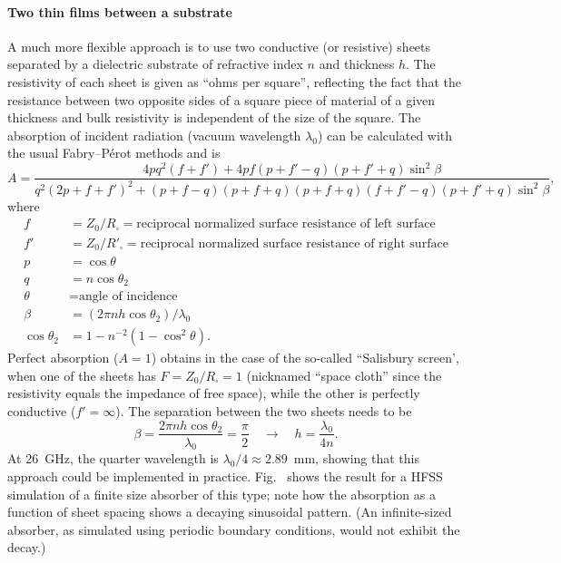 \paragraph{Two thin films between a substrate}

A much more flexible approach is to use two conductive (or resistive) sheets
separated by a dielectric substrate of refractive index $n$ and thickness $h$.
The resistivity of each sheet is given as ``ohms per square'', reflecting the
fact that the resistance between two opposite sides of a square piece of
material of a given thickness and bulk resistivity is independent of the size of
the square. The absorption of incident radiation (vacuum wavelength $\lambda_0$)
can be calculated with the usual Fabry--P\'erot methods and is
\cite{carli1981absorption}
%
\[
   A=\frac
   {4pq^2(f+f')+4pf(p+f'-q)(p+f'+q)\sin^2\beta}
   {q^2(2p+f+f')^2+(p+f-q)(p+f+q)(p+f+q)(f+f'-q)(p+f'+q)\sin^2\beta},
\]
%
where
%
\begin{align*}
   f            &= Z_0/R_\square = \text{reciprocal normalized surface resistance of left surface}\\
   f'           &= Z_0/R'_\square = \text{reciprocal normalized surface resistance of right surface}\\
   p            &= \cos\theta\\
   q            &= n\cos\theta_2\\
   \theta       &= \text{angle of incidence}\\
   \beta        &= (2\pi nh\cos\theta_2)/\lambda_0\\
   \cos\theta_2 &= 1-n^{-2}(1-\cos^2\theta).
\end{align*}
%
Perfect absorption ($A=1$) obtains in the case of the so-called ``Salisbury
screen', when one of the sheets has $F=Z_0/R_\square=1$ (nicknamed ``space
cloth'' since the resistivity equals the impedance of free space), while the
other is perfectly conductive ($f'=\infty$). The separation between the two
sheets needs to be
%
\[
   \beta=\frac{2\pi nh\cos\theta_2}{\lambda_0}=\frac{\pi}{2}
   \quad\to\quad
   h=\frac{\lambda_0}{4n}.
\]
%
At 26~GHz, the quarter wavelength is $\lambda_0/4\approx2.89$~mm, showing that
this approach could be implemented in practice. Fig.~ shows the
result for a HFSS simulation of a finite size absorber of this type; note how
the absorption as a function of sheet spacing shows a decaying sinusoidal
pattern. (An infinite-sized absorber, as simulated using periodic boundary
conditions, would not exhibit the decay.)

